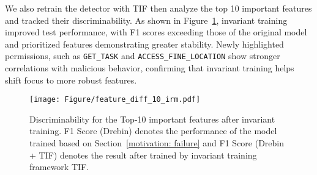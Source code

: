 We also retrain the detector with TIF then analyze the top 10 important features and tracked their discriminability. As shown in Figure~\ref{fig:feature_diff_10_irm},  invariant training improved test performance, with F1 scores exceeding those of the original model and prioritized features demonstrating greater stability. Newly highlighted permissions, such as \verb|GET_TASK| and \verb|ACCESS_FINE_LOCATION| show stronger correlations with malicious behavior, confirming that invariant training helps shift focus to more robust features.

\begin{center}
\end{center}

\begin{figure}
    \centering
    \texttt{[image: Figure/feature\_diff\_10\_irm.pdf]}
    \caption{Discriminability for the Top-10 important features after invariant training. F1 Score (Drebin) denotes the performance of the model trained based on Section~\ref{motivation: failure} and F1 Score (Drebin + TIF) denotes the result after trained by invariant training framework TIF.}
    \label{fig:feature_diff_10_irm}
\end{figure}





